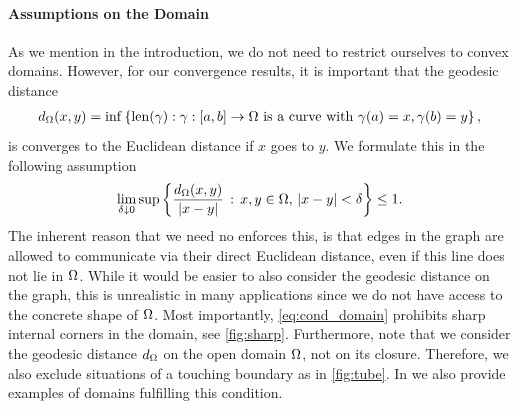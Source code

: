 \paragraph{Assumptions on the Domain} As we mention in the introduction, we do not need to restrict ourselves to convex domains. However, for our convergence results, it is important that the geodesic distance 
%
\begin{align*}
d_\Omega(x,y)=\inf\left\lbrace
\mathrm{len}(\gamma): \gamma:[a,b]\rightarrow\Omega 
\text{ is a curve with }
\gamma(a)=x, \gamma(b) = y
\right\rbrace,
\end{align*}
%
is converges to the Euclidean distance if $x$ goes to $y$. We formulate this in the following assumption
%
\begin{align}\label{eq:cond_domain}
\lim_{\delta\downarrow0}\sup
\left\lbrace
\frac{d_\Omega(x,y)}{\left|x-y\right|}\,:\,
x,y\in\Omega,\,\left|x-y\right|<\delta\right\rbrace \leq 1.
\end{align}
%
The inherent reason that we need no enforces this, is that edges in the graph are allowed to communicate via their direct Euclidean distance, even if this line does not lie in $\Omega$. While it would be easier to also consider the geodesic distance on the graph, this is unrealistic in many applications since we do not have access to the concrete shape of $\Omega$. Most importantly, \cref{eq:cond_domain} prohibits sharp internal corners in the domain, see \cref{fig:sharp}. Furthermore, note that we consider the geodesic distance $d_\Omega$ on the open domain $\Omega$, not on its closure. Therefore, we also exclude situations of a touching boundary as in \cref{fig:tube}. In \cite{roith2022continuum} we also provide examples of domains fulfilling this condition.
%
